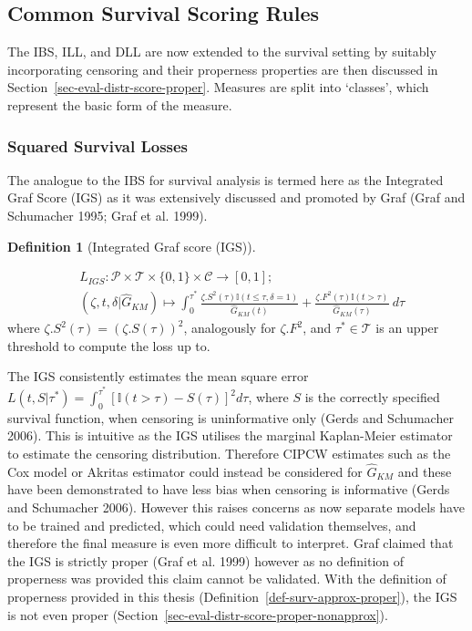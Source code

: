 \documentclass[
  letterpaper,
]{scrbook}
\theoremstyle{plain}
\theoremstyle{definition}
\newtheorem{definition}{Definition}[chapter]
\theoremstyle{remark}
\begin{document}
\hypertarget{sec-eval-distr-commonsurv}{%
\subsection{Common Survival Scoring
Rules}\label{sec-eval-distr-commonsurv}}

The IBS, ILL, and DLL are now extended to the survival setting by
suitably incorporating censoring and their properness properties are
then discussed in Section~\ref{sec-eval-distr-score-proper}. Measures
are split into `classes', which represent the basic form of the measure.

\hypertarget{squared-survival-losses}{%
\subsubsection{Squared Survival Losses}\label{squared-survival-losses}}

The analogue to the IBS for survival analysis is termed here as the
Integrated Graf Score (IGS) as it was extensively discussed and promoted
by Graf (Graf and Schumacher 1995; Graf et al. 1999).

\leavevmode{}%
\begin{definition}[Integrated Graf score (IGS)]\label{def-igs}

\[
\begin{split}
&L_{IGS}: \mathcal{P}\times \mathcal{T}\times \{0,1\}\times \mathcal{C}\rightarrow [0,1]; \\
&(\zeta, t, \delta|\hat{G}_{KM}) \mapsto \int^{\tau^*}_0  \frac{\zeta.S^2(\tau) \mathbb{I}(t \leq \tau, \delta=1)}{\hat{G}_{KM}(t)} + \frac{\zeta.F^2(\tau) \mathbb{I}(t > \tau)}{\hat{G}_{KM}(\tau)} \ d\tau
\end{split}
\label{eq:igs}
\] where \(\zeta.S^2(\tau) = (\zeta.S(\tau))^2\), analogously for
\(\zeta.F^2\), and \(\tau^* \in \mathcal{T}\) is an upper threshold to
compute the loss up to.

\end{definition}

The IGS consistently estimates the mean square error
\(L(t, S|\tau^*) = \int^{\tau^*}_0 [\mathbb{I}(t > \tau) - S(\tau)]^2 d\tau\),
where \(S\) is the correctly specified survival function, when censoring
is uninformative only (Gerds and Schumacher 2006). This is intuitive as
the IGS utilises the marginal Kaplan-Meier estimator to estimate the
censoring distribution. Therefore CIPCW estimates such as the Cox model
or Akritas estimator could instead be considered for \(\hat{G}_{KM}\)
and these have been demonstrated to have less bias when censoring is
informative (Gerds and Schumacher 2006). However this raises concerns as
now separate models have to be trained and predicted, which could need
validation themselves, and therefore the final measure is even more
difficult to interpret. Graf claimed that the IGS is strictly proper
(Graf et al. 1999) however as no definition of properness was provided
this claim cannot be validated. With the definition of properness
provided in this thesis (Definition~\ref{def-surv-approx-proper}), the
IGS is not even proper
(Section~\ref{sec-eval-distr-score-proper-nonapprox}).
\end{document}
